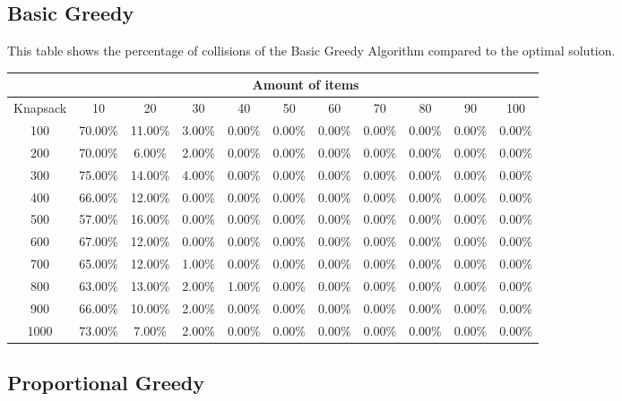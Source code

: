 \documentclass{report}
\begin{document}
\subsection*{Basic Greedy}

 This table shows the percentage of collisions of the Basic Greedy Algorithm compared to the optimal solution.
\begin{table}[H]
\hspace{-3cm}
\begin{tabular}{|c|c|c|c|c|c|c|c|c|c|c|}
\hline
& \multicolumn{10}{c|}{Amount of items} \\
\hline
Knapsack & 10 & 20 & 30 & 40 & 50 & 60 & 70 & 80 & 90 & 100 \\
\hline
100 & 70.00\% & 11.00\% & 3.00\% & 0.00\% & 0.00\% & 0.00\% & 0.00\% & 0.00\% & 0.00\% & 0.00\% \\ 
\hline
200 & 70.00\% & 6.00\% & 2.00\% & 0.00\% & 0.00\% & 0.00\% & 0.00\% & 0.00\% & 0.00\% & 0.00\% \\ 
\hline
300 & 75.00\% & 14.00\% & 4.00\% & 0.00\% & 0.00\% & 0.00\% & 0.00\% & 0.00\% & 0.00\% & 0.00\% \\ 
\hline
400 & 66.00\% & 12.00\% & 0.00\% & 0.00\% & 0.00\% & 0.00\% & 0.00\% & 0.00\% & 0.00\% & 0.00\% \\ 
\hline
500 & 57.00\% & 16.00\% & 0.00\% & 0.00\% & 0.00\% & 0.00\% & 0.00\% & 0.00\% & 0.00\% & 0.00\% \\ 
\hline
600 & 67.00\% & 12.00\% & 0.00\% & 0.00\% & 0.00\% & 0.00\% & 0.00\% & 0.00\% & 0.00\% & 0.00\% \\ 
\hline
700 & 65.00\% & 12.00\% & 1.00\% & 0.00\% & 0.00\% & 0.00\% & 0.00\% & 0.00\% & 0.00\% & 0.00\% \\ 
\hline
800 & 63.00\% & 13.00\% & 2.00\% & 1.00\% & 0.00\% & 0.00\% & 0.00\% & 0.00\% & 0.00\% & 0.00\% \\ 
\hline
900 & 66.00\% & 10.00\% & 2.00\% & 0.00\% & 0.00\% & 0.00\% & 0.00\% & 0.00\% & 0.00\% & 0.00\% \\ 
\hline
1000 & 73.00\% & 7.00\% & 2.00\% & 0.00\% & 0.00\% & 0.00\% & 0.00\% & 0.00\% & 0.00\% & 0.00\% \\ 
\hline
\end{tabular}
\end{table}

\subsection*{Proportional Greedy}
\end{document}
